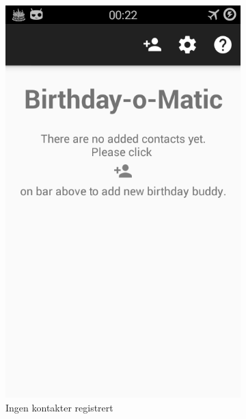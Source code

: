 \begin{figure}[ht]
    \centering
    \begin{subfigure}[b]{0.35\textwidth}
        \includegraphics[width=\textwidth]{./img/1.png}
        \caption{Ingen kontakter registrert}
        \label{fig:ingen_kontakter}
    \end{subfigure}
    \begin{subfigure}[b]{0.35\textwidth}

\end{subfigure}
\end{figure}
